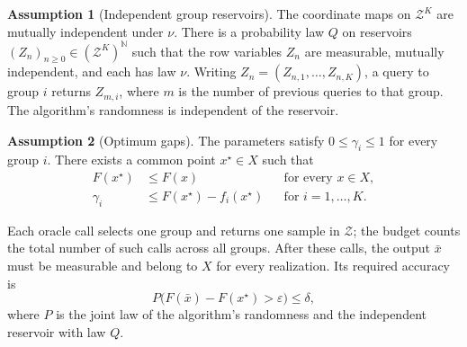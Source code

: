 \documentclass[10pt]{article}
\theoremstyle{definition}
\newtheorem{assumption}{Assumption}
\begin{document}
\begin{assumption}[Independent group reservoirs]
The coordinate maps on $\mathcal{Z}^K$ are mutually independent under $\nu$. There is a probability law $Q$ on reservoirs $(Z_n)_{n\geq0}\in(\mathcal{Z}^K)^{\mathbb{N}}$ such that the row variables $Z_n$ are measurable, mutually independent, and each has law $\nu$. Writing $Z_n=(Z_{n,1},\ldots,Z_{n,K})$, a query to group $i$ returns $Z_{m,i}$, where $m$ is the number of previous queries to that group. The algorithm's randomness is independent of the reservoir.
\end{assumption}

\begin{assumption}[Optimum gaps]
The parameters satisfy $0\leq\gamma_i\leq1$ for every group $i$. There exists a common point $x^\star\in X$ such that
\[
\begin{aligned}
F(x^\star)&\leq F(x) &&\text{for every }x\in X,\\
\gamma_i&\leq F(x^\star)-f_i(x^\star)
&&\text{for }i=1,\ldots,K.
\end{aligned}
\]
\end{assumption}

Each oracle call selects one group and returns one sample in $\mathcal{Z}$; the budget counts the total number of such calls across all groups. After these calls, the output $\bar{x}$ must be measurable and belong to $X$ for every realization. Its required accuracy is
\[
P\bigl(F(\bar{x})-F(x^\star)>\varepsilon\bigr)\leq\delta,
\]
where $P$ is the joint law of the algorithm's randomness and the independent reservoir with law $Q$.
\end{document}
